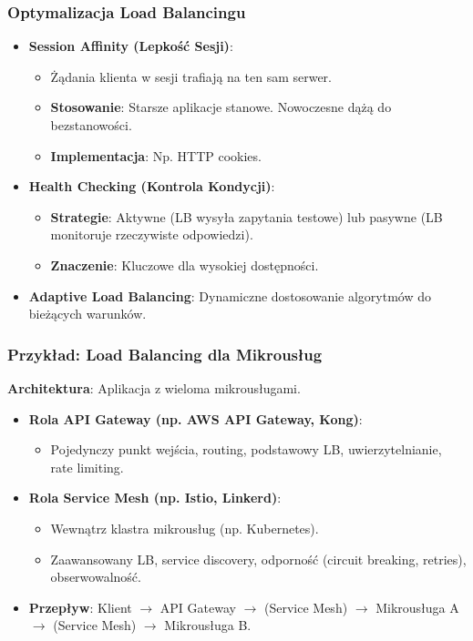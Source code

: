 \documentclass[aspectratio=169,xcolor=table]{beamer}
\begin{document}
\begin{frame}
  \frametitle{Optymalizacja Load Balancingu}
  \begin{itemize}
    \item \textbf{Session Affinity (Lepkość Sesji)}:
        \begin{itemize}
            \item Żądania klienta w sesji trafiają na ten sam serwer.
            \item \textbf{Stosowanie}: Starsze aplikacje stanowe. Nowoczesne dążą do bezstanowości.
            \item \textbf{Implementacja}: Np. HTTP cookies.
        \end{itemize}
    \item \textbf{Health Checking (Kontrola Kondycji)}:
        \begin{itemize}
            \item \textbf{Strategie}: Aktywne (LB wysyła zapytania testowe) lub pasywne (LB monitoruje rzeczywiste odpowiedzi).
            \item \textbf{Znaczenie}: Kluczowe dla wysokiej dostępności.
        \end{itemize}
    \item \textbf{Adaptive Load Balancing}: Dynamiczne dostosowanie algorytmów do bieżących warunków.
  \end{itemize}
\end{frame}

\begin{frame}
  \frametitle{Przykład: Load Balancing dla Mikrousług}
  \textbf{Architektura}: Aplikacja z wieloma mikrousługami.
  \begin{itemize}
    \item \textbf{Rola API Gateway (np. AWS API Gateway, Kong)}:
        \begin{itemize}
            \item Pojedynczy punkt wejścia, routing, podstawowy LB, uwierzytelnianie, rate limiting.
        \end{itemize}
    \item \textbf{Rola Service Mesh (np. Istio, Linkerd)}:
        \begin{itemize}
            \item Wewnątrz klastra mikrousług (np. Kubernetes).
            \item Zaawansowany LB, service discovery, odporność (circuit breaking, retries), obserwowalność.
        \end{itemize}
    \item \textbf{Przepływ}: Klient $\rightarrow$ API Gateway $\rightarrow$ (Service Mesh) $\rightarrow$ Mikrousługa A $\rightarrow$ (Service Mesh) $\rightarrow$ Mikrousługa B.
  \end{itemize}
\end{frame}
\end{document}

